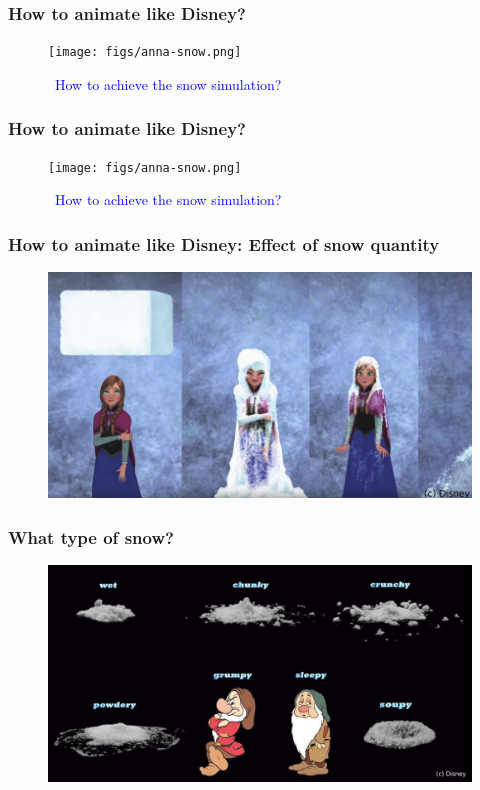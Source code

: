 \documentclass[notes]{beamer}
\begin{document}
\begin{frame}
	\frametitle{How to animate like Disney?}
	\begin{figure}[ht]
		\centering
		\texttt{[image: figs/anna-snow.png]}
		\caption*{\textcolor{blue}{\faCommentsO ~How to achieve the snow simulation?}}
	\end{figure}
\end{frame}

\begin{frame}
	\frametitle{How to animate like Disney?}
	\begin{figure}[ht]
		\centering
		\texttt{[image: figs/anna-snow.png]}
		\caption*{\textcolor{blue}{\faCommentsO ~How to achieve the snow simulation?}}
	\end{figure}
\end{frame}

\begin{frame}
	\frametitle{How to animate like Disney: Effect of snow quantity}
	\begin{figure}[ht]
		\centering
		\includegraphics[width=\textwidth]{figs/anna-quantity-snow.png}
	\end{figure}
\end{frame}

\begin{frame}
	\frametitle{What type of snow?}
	\begin{figure}[ht]
		\centering
		\includegraphics[width=\textwidth]{figs/snow-types.png}
	\end{figure}
\end{frame}
\end{document}
